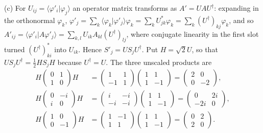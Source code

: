 (c) For $U_{ij}=\langle\varphi'_i|\varphi_j\rangle$ an operator matrix
transforms as $A'=UAU^\dagger$: expanding in the orthonormal $\varphi_k$,
$\varphi'_j=\sum_k\langle\varphi_k|\varphi'_j\rangle\varphi_k
=\sum_kU_{jk}^*\varphi_k=\sum_k(U^\dagger)_{kj}\varphi_k$, and so
$A'_{ij}=\langle\varphi'_i|A\varphi'_j\rangle
=\sum_{k,l}U_{ik}A_{kl}(U^\dagger)_{lj}$, where conjugate linearity in
the first slot turned $(U^\dagger)_{ki}^*$ into $U_{ik}$.
Hence $S'_j=US_jU^\dagger$. Put $H=\sqrt2U$, so that
$US_jU^\dagger=\frac12HS_jH$ because $U^\dagger=U$.
The three unscaled products are
\begin{align*}
H\begin{pmatrix}0&1\\1&0\end{pmatrix}H
&=\begin{pmatrix}1&1\\-1&1\end{pmatrix}
  \begin{pmatrix}1&1\\1&-1\end{pmatrix}
=\begin{pmatrix}2&0\\0&-2\end{pmatrix},\\
H\begin{pmatrix}0&-i\\i&0\end{pmatrix}H
&=\begin{pmatrix}i&-i\\-i&-i\end{pmatrix}
  \begin{pmatrix}1&1\\1&-1\end{pmatrix}
=\begin{pmatrix}0&2i\\-2i&0\end{pmatrix},\\
H\begin{pmatrix}1&0\\0&-1\end{pmatrix}H
&=\begin{pmatrix}1&-1\\1&1\end{pmatrix}
  \begin{pmatrix}1&1\\1&-1\end{pmatrix}
=\begin{pmatrix}0&2\\2&0\end{pmatrix}.
\end{align*}
